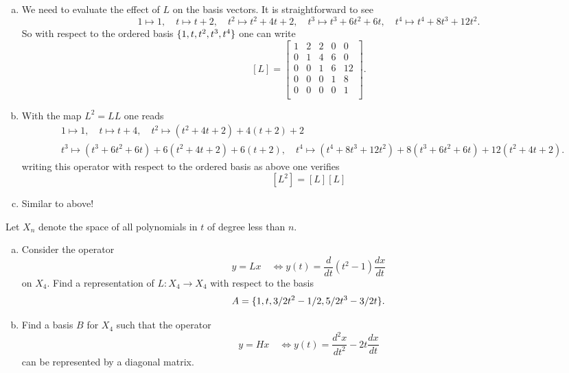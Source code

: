 \begin{solution}
	\begin{enumerate}[(a)]
		\item We need to evaluate the effect of $ L $ on the basis vectors. It is straightforward to see
		\[ 1\mapsto 1,\quad t\mapsto t+2,\quad t^2\mapsto t^2+4t+2,\quad t^3\mapsto t^3+6t^2 +6t,\quad t^4\mapsto t^4+8t^3+12t^2. \]
		So with respect to the ordered basis $ \{1,t,t^2,t^3,t^4\} $ one can write
		\[ [L] = 
		\begin{bmatrix}
			1 & 2 & 2 & 0 & 0 \\
			0 & 1 & 4 & 6 & 0 \\
			0 & 0 & 1 & 6 & 12 \\
			0 & 0 & 0 & 1 & 8 \\
			0 & 0 & 0 & 0 & 1 \\
		\end{bmatrix}.
		 \]
		 
		 \item With the map $ L^2 = LL $ one reads
		 \begin{align*}
		 	&1\mapsto 1,\quad t\mapsto t+4,\quad t^2\mapsto (t^2+4t+2)+4(t+2)+2  \\
		 	&t^3\mapsto (t^3+6t^2 +6t) + 6(t^2+4t+2) + 6(t+2), \quad t^4\mapsto (t^4+8t^3+12t^2) + 8(t^3+6t^2 +6t) +12(t^2+4t+2).
		 \end{align*}
		 writing this operator with respect to the ordered basis as above one verifies
		 \[ [L^2] = [L][L] \]
		 
		 \item Similar to above!
	\end{enumerate}
\end{solution}





\begin{problem}
	Let $ X_n $ denote the space of all polynomials in $ t $ of degree less than $ n $.
	\begin{enumerate}[(a)]
		\item Consider the operator
		\[ y = Lx \quad \Longleftrightarrow y(t) = \frac{d}{dt}(t^2-1)\frac{dx}{dt} \]
		on $ X_4 $. Find a representation of $ L:X_4\to X_4 $ with respect to the basis
		\[ A = \{1,t,3/2t^2-1/2,5/2t^3-3/2t\}. \]
		
		
		\item Find a basis $ B $ for $ X_4 $ such that the operator
		\[ y=  Hx \quad \Longleftrightarrow y(t) = \frac{d^2x}{dt^2} - 2t\frac{dx}{dt} \]
		can be represented by a diagonal matrix.
	\end{enumerate}
\end{problem}

